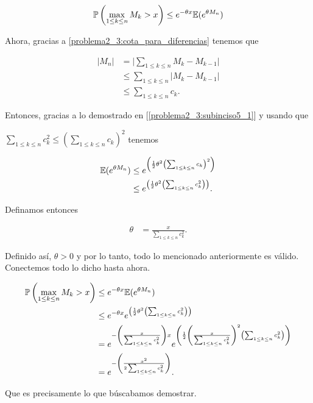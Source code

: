\begin{align}
    \mathbb{P}\left( \max_{1 \leq k \leq n} M_k > x \right) \leq e^{- \theta x} \mathbb{E}(e^{\theta M_n})
\end{align}\pn

Ahora, gracias a \eqref{problema2_3:cota_para_diferencias} tenemos que

\begin{align}
        |M_n|   &=      \bigg| \sum_{1 \leq k \leq n} M_k - M_{k-1} \bigg|       \\
                &\leq   \sum_{1 \leq k \leq n} \bigg| M_k - M_{k-1} \bigg|       \\
                &\leq   \sum_{1 \leq k \leq n} c_k.                               
\end{align}

Entonces, gracias a lo demostrado en [\ref{problema2_3:subinciso5_1}] y usando que \par
$\sum_{1 \leq k \leq n} c_k^2 \leq (\sum_{1 \leq k \leq n} c_k)^2$ tenemos

\begin{align}
    \mathbb{E}(e^{\theta M_n})  &\leq   e^{\left( \frac{1}{2} \theta^2 \left( \sum_{1 \leq k \leq n} c_k \right)^2\right)}  \\
                        &\leq   e^{\left( \frac{1}{2} \theta^2 \left( \sum_{1 \leq k \leq n} c_k^2 \right)\right)}.
\end{align}\pn

Definamos entonces

\begin{align}
    \theta &= \frac{x}{\sum_{1 \leq k \leq n} c_k^2}.
\end{align}\pn

Definido así, $\theta > 0$ y por lo tanto, todo lo mencionado anteriormente es válido. Conectemos todo lo dicho hasta ahora.\pn

\begin{align}
    \mathbb{P}\left( \max_{1 \leq k \leq n} M_k > x \right)    &\leq   e^{- \theta x} \mathbb{E}(e^{\theta M_n})                                                                                                                                                           \\
                                                        &\leq   e^{- \theta x} e^{\left( \frac{1}{2} \theta^2 \left( \sum_{1 \leq k \leq n} c_k^2 \right)\right)}                                                                                           \\
                                                        &=      e^{- \left(\frac{x}{\sum_{1 \leq k \leq n} c_k^2}\right) x} e^{\left( \frac{1}{2} \left(\frac{x}{\sum_{1 \leq k \leq n} c_k^2}\right)^2 \left( \sum_{1 \leq k \leq n} c_k^2 \right)\right)} \\
                                                        &=      e^{- \left(\frac{x^2}{2 \sum_{1 \leq k \leq n} c_k^2}\right)}.
\end{align}\pn

Que es precisamente lo que búscabamos demostrar.

